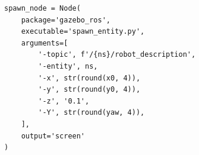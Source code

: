 \begin{figure}[t]
\centering
\begin{lstlisting}[style=python,
    caption={Spawn de un modelo de robot en Gazebo.},
    label={lst:spawn_node}]
spawn_node = Node(
    package='gazebo_ros',
    executable='spawn_entity.py',
    arguments=[
        '-topic', f'/{ns}/robot_description',
        '-entity', ns,
        '-x', str(round(x0, 4)),
        '-y', str(round(y0, 4)),
        '-z', '0.1',
        '-Y', str(round(yaw, 4)),
    ],
    output='screen'
)
\end{lstlisting}
\end{figure}
